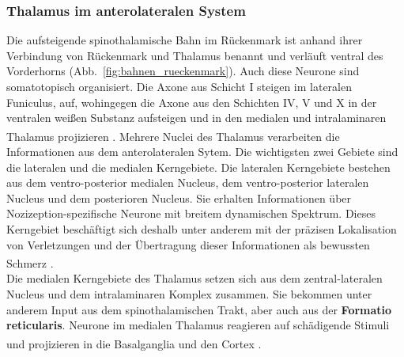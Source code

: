 \documentclass[12pt,a4paper,pdftex]{article}
\begin{document}
\subsubsection*{Thalamus im anterolateralen System}
Die aufsteigende spinothalamische Bahn  im Rückenmark ist anhand ihrer Verbindung von Rückenmark und Thalamus benannt und verläuft ventral des Vorderhorns  (Abb.~\ref{fig:bahnen_rueckenmark}). Auch diese Neurone sind somatotopisch organisiert. Die Axone aus Schicht I steigen im lateralen Funiculus, auf, wohingegen die Axone aus den Schichten IV, V und X in der ventralen weißen Substanz aufsteigen und in den medialen und intralaminaren Thalamus projizieren \textsuperscript{\cite[25]{paxinos2014rat}}. 
Mehrere Nuclei des Thalamus verarbeiten die Informationen aus dem anterolateralen Sytem. Die wichtigsten zwei Gebiete sind die lateralen und die medialen Kerngebiete. 
Die lateralen Kerngebiete bestehen aus dem ventro-posterior medialen Nucleus, dem ventro-posterior lateralen Nucleus und dem posterioren Nucleus. Sie erhalten Informationen über Nozizeption-spezifische Neurone mit breitem dynamischen Spektrum. Dieses Kerngebiet beschäftigt sich deshalb unter anderem mit der präzisen Lokalisation von Verletzungen und der Übertragung dieser Informationen als bewussten Schmerz \textsuperscript{\cite[24]{kandel2013principles}}.
\\
\noindent Die medialen Kerngebiete des Thalamus setzen sich aus dem zentral-lateralen Nucleus und dem intralaminaren Komplex zusammen. Sie bekommen unter anderem Input aus dem spinothalamischen Trakt, aber auch aus der \textbf{Formatio reticularis}. Neurone im medialen Thalamus reagieren auf schädigende Stimuli und projizieren in die Basalganglia und den Cortex \textsuperscript{\cite[24]{kandel2013principles}}.
\end{document}
